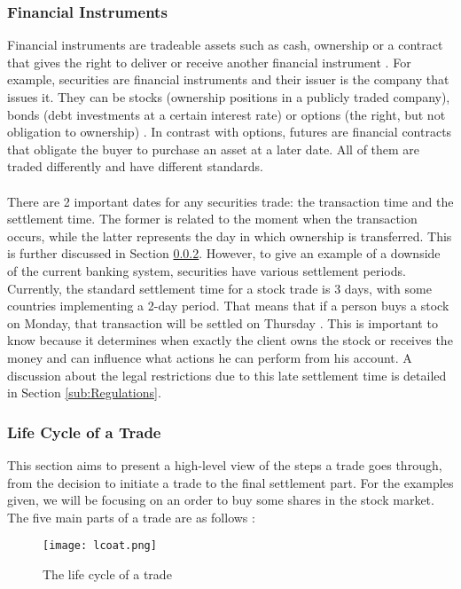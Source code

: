 \documentclass[12pt,twoside]{article}
\begin{document}
\subsubsection{Financial Instruments}
\label{sub:FinancialInstruments}
Financial instruments are tradeable assets such as cash, ownership or a contract that gives the right to deliver or receive another financial instrument \cite{FA}. For example, securities are financial instruments and their issuer is the company that issues it. They can be stocks (ownership positions in a publicly traded company), bonds (debt investments at a certain interest rate) or options (the right, but not obligation to ownership) \cite{Security}. In contrast with options, futures are financial contracts that obligate the buyer to purchase an asset at a later date. All of them are traded differently and have different standards. 
\\ \\
There are 2 important dates for any securities trade: the transaction time and the settlement time. The former is related to the moment when the transaction occurs, while the latter represents the day in which ownership is transferred. This is further discussed in Section \ref{sub:LCOAT}. However, to give an example of a downside of the current banking system, securities have various settlement periods. Currently, the standard settlement time for a stock trade is 3 days, with some countries implementing a 2-day period. That means that if a person buys a stock on Monday, that transaction will be settled on Thursday \cite{TTimes}. This is important to know because it determines when exactly the client owns the stock or receives the money and can influence what actions he can perform from his account. A discussion about the legal restrictions due to this late settlement time is detailed in Section \ref{sub:Regulations}.
\subsubsection{Life Cycle of a Trade}
\label{sub:LCOAT}
This section aims to present a high-level view of the steps a trade goes through, from the decision to initiate a trade to the final settlement part. For the examples given, we will be focusing on an order to buy some shares in the stock market. The five main parts of a trade are as follows \cite{TradeCycle}:

\begin{figure}[H]
\centering
\texttt{[image: lcoat.png]}
\centering
\caption{The life cycle of a trade}
\label{fig:scheme}
\end{figure}
\end{document}

